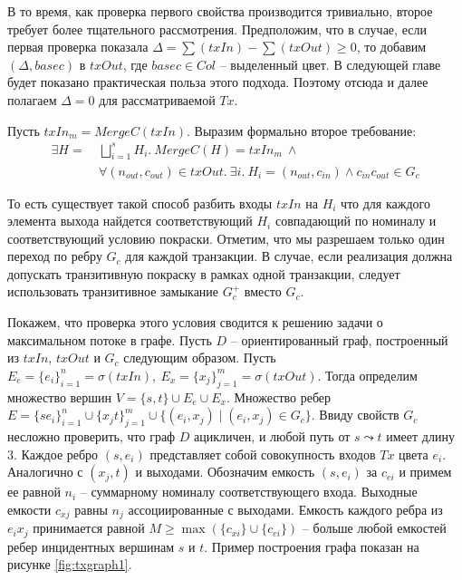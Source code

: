 \documentclass[specification,annotation]{itmo-student-thesis}
\begin{document}
В то время, как проверка первого свойства производится тривиально,
второе требует более тщательного рассмотрения. Предположим, что в
случае, если первая проверка показала $\Delta = \sum(txIn) -
\sum(txOut) \geq 0$, то добавим $(\Delta, basec)$ в $txOut$, где
$basec \in Col$ -- выделенный цвет. В следующей главе будет показано
практическая польза этого подхода. Поэтому отсюда и далее полагаем
$\Delta = 0$ для рассматриваемой $Tx$.

Пусть $txIn_m = MergeC(txIn)$. Выразим формально второе требование:
\begin{align}
  \exists H = \ &\bigsqcup_{i=1}^s{H_i}. \ MergeC(H) = txIn_m \ \wedge \nonumber \\
                &\forall (n_{out},c_{out}) \in txOut . \ \exists i . \ H_i = (n_{out},c_{in}) \wedge c_{in}c_{out} \in G_c \label{eq:1}
\end{align}

То есть существует такой способ разбить входы $txIn$ на $H_i$ что для
каждого элемента выхода найдется соответствующий $H_i$ совпадающий по
номиналу и соответствующий условию покраски. Отметим, что мы разрешаем
только один переход по ребру $G_c$ для каждой транзакции. В случае,
если реализация должна допускать транзитивную покраску в рамках одной
транзакции, следует использовать транзитивное замыкание $G_c^{+}$
вместо $G_c$.

Покажем, что проверка этого условия сводится к решению задачи о
максимальном потоке в графе. Пусть $D$ -- ориентированный граф,
построенный из $txIn$, $txOut$ и $G_c$ следующим образом. Пусть $E_e =
\{e_i\}_{i=1}^n = \sigma(txIn),\ E_x = \{x_j\}_{j=1}^m =
\sigma(txOut)$. Тогда определим множество вершин $V = \{s, t\} \cup
E_e \cup E_x$. Множество ребер $E = \{se_i\}_{i=1}^n \cup
\{x_jt\}_{j=1}^m \cup \{(e_i,x_j) \mid (e_i,x_j) \in G_c\}$. Ввиду
свойств $G_c$ несложно проверить, что граф $D$ ацикличен, и любой
путь от $s \leadsto t$ имеет длину $3$. Каждое ребро $(s,e_i)$
представляет собой совокупность входов $Tx$ цвета $e_i$. Аналогично с
$(x_j,t)$ и выходами. Обозначим емкость $(s,e_i)$ за $c_{ei}$ и примем
ее равной $n_i$ -- суммарному номиналу соответствующего
входа. Выходные емкости $c_{xj}$ равны $n_j$ ассоциированные с
выходами. Емкость каждого ребра из $e_ix_j$ принимается равной $M \geq
\max{(\{c_{xi}\} \cup \{c_{ei}\})}$ -- больше любой емкостей ребер
инцидентных вершинам $s$ и $t$. Пример построения графа показан на
рисунке \ref{fig:txgraph1}.
\end{document}
